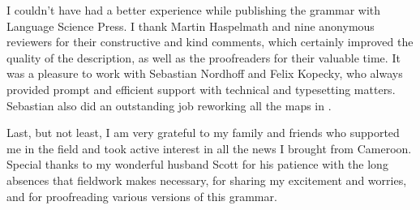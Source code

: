 I couldn't have had a better experience while publishing the grammar with Language Science Press. I thank Martin Haspelmath and nine anonymous reviewers for their constructive and kind comments, which certainly improved the quality of the description, as well as the proofreaders for their valuable time. It was a pleasure to work with Sebastian Nordhoff and Felix Kopecky, who always provided prompt and efficient support with technical and typesetting matters. Sebastian also did an outstanding job reworking all the maps in . 

Last, but not least, I am very grateful to my family and friends who supported me in the field and took active interest in all the news I brought from Cameroon. Special thanks to my wonderful husband Scott for his patience with the long absences that fieldwork makes necessary, for sharing my excitement and worries, and for proofreading various versions of this grammar.
